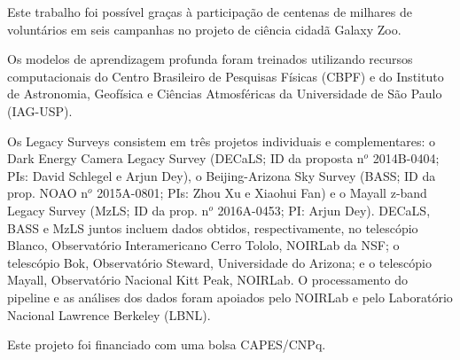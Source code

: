 \documentclass[
	12pt,				%
	openright,			%
	twoside,			%
	a4paper,			%
  sumario=tradicional,
	english,			%
	french,				%
	spanish,			%
	brazil				%
	]{abntex2}
\begin{document}
\begin{agradecimentos}
  Este trabalho foi possível graças à participação de centenas de milhares de voluntários em seis campanhas no projeto de ciência cidadã Galaxy Zoo.


  Os modelos de aprendizagem profunda foram treinados utilizando recursos computacionais do Centro Brasileiro de Pesquisas Físicas (CBPF) e do Instituto de Astronomia, Geofísica e Ciências Atmosféricas da Universidade de São Paulo (IAG-USP).

  Os Legacy Surveys consistem em três projetos individuais e complementares: o Dark Energy Camera Legacy Survey (DECaLS; ID da proposta n$^o$ 2014B-0404; PIs: David Schlegel e Arjun Dey), o Beijing-Arizona Sky Survey (BASS; ID da prop. NOAO n$^o$ 2015A-0801; PIs: Zhou Xu e Xiaohui Fan) e o Mayall z-band Legacy Survey (MzLS; ID da prop. n$^o$ 2016A-0453; PI: Arjun Dey). DECaLS, BASS e MzLS juntos incluem dados obtidos, respectivamente, no telescópio Blanco, Observatório Interamericano Cerro Tololo, NOIRLab da NSF; o telescópio Bok, Observatório Steward, Universidade do Arizona; e o telescópio Mayall, Observatório Nacional Kitt Peak, NOIRLab. O processamento do pipeline e as análises dos dados foram apoiados pelo NOIRLab e pelo Laboratório Nacional Lawrence Berkeley (LBNL).

  Este projeto foi financiado com uma bolsa CAPES/CNPq.
\end{agradecimentos}


\end{document}
